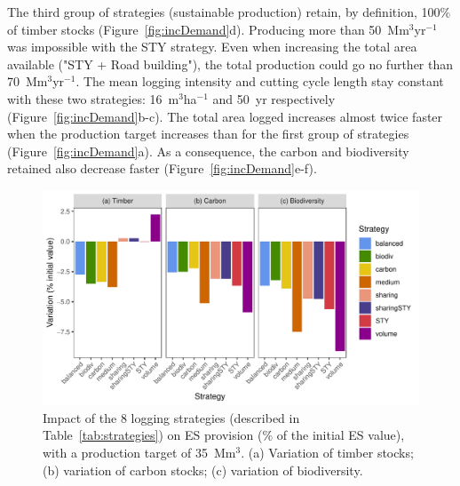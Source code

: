 \documentclass{article}
\begin{document}
The third group of strategies (sustainable production) retain, by definition, 100\% of timber stocks (Figure~\ref{fig:incDemand}d). Producing more than 50~Mm$^3$yr$^{-1}$ was impossible with the STY strategy. Even when increasing the total area available ("STY + Road building"), the total production could go no further than 70~Mm$^3$yr$^{-1}$. 
The mean logging intensity and cutting cycle length stay constant with these two strategies: 16~m$^3$ha$^{-1}$ and 50~yr respectively (Figure~\ref{fig:incDemand}b-c). The total area logged increases almost twice faster when the production target increases than for the first group of strategies (Figure~\ref{fig:incDemand}a). As a consequence, the carbon and biodiversity retained also decrease faster (Figure~\ref{fig:incDemand}e-f). 

\begin{figure}
    \centering
    \includegraphics[width=\linewidth]{graphs/OptimScenario}
    \caption{Impact of the 8 logging strategies (described in Table~\ref{tab:strategies}) on ES provision (\% of the initial ES value), with a production target of 35~Mm$^3$. (a) Variation of timber stocks; (b) variation of carbon stocks; (c) variation of biodiversity.}
    \label{fig:scenESProv}
\end{figure}
\end{document}
